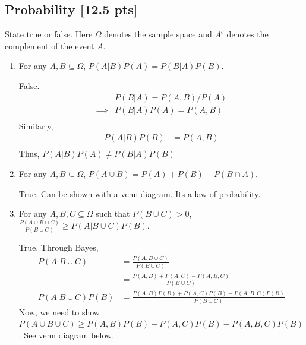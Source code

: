 \documentclass[a4paper]{article}
\theoremstyle{definition}
\newenvironment{soln}{
	\leavevmode\color{blue}\ignorespaces
}{}
\begin{document}
	\subsection{Probability [12.5 pts]}
	State true or false. Here $\Omega$ denotes the sample space and $A^c$ denotes the complement of the event $A$.
	\begin{enumerate}
		\item For any $A, B \subseteq \Omega$, $P(A|B)P(A) = P(B|A)P(B)$.\\
		\begin{soln}
			False. 
			\begin{align*}
				&P(B|A) = P(A,B)/P(A) \\
				\implies &P(B|A)P(A) = P(A,B) \\
			\end{align*}
			Similarly,
			\begin{align*}
				P(A|B)P(B) &= P(A,B) \\
			\end{align*}
			Thus, $P(A|B)P(A) \ne P(B|A)P(B)$
		
		\end{soln}
		
		\item For any $A, B \subseteq \Omega$, $P(A \cup B) = P(A) + P(B) - P(B \cap A)$.\\         
		\begin{soln}  
			True. Can  be shown with a venn diagram. Its a law of probability.
		\end{soln}
		
		\item For any $A, B, C \subseteq \Omega$ such that $P(B \cup C) > 0$,
		$\frac{P(A \cup B \cup C)}{P(B \cup C)} \geq P(A | B \cup C) P(B)$.\\ 
		\begin{soln}
			True. Through Bayes, 
			\begin{align}
				P(A|B \cup C) &= \frac{P(A,B \cup C)}{P(B \cup C)} \\
				&= \frac{P(A,B) + P(A,C) - P(A,B,C)}{P(B \cup C)} \\
				P(A|B \cup C) P(B)&= \frac{P(A,B)P(B) + P(A,C)P(B) - P(A,B,C)P(B)}{P(B \cup C)}
			\end{align}
			Now, we need to show $P(A \cup B \cup C) \ge P(A,B)P(B) + P(A,C)P(B) - P(A,B,C)P(B)$. See venn diagram below, \\
\end{soln}
\end{enumerate}
\end{document}
